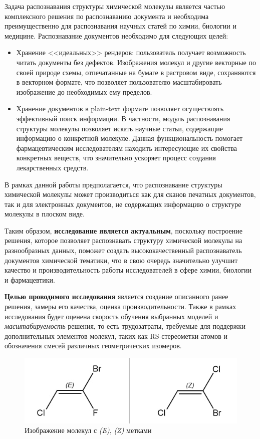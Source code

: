Задача распознавания структуры химической молекулы является частью комплексного решения по распознаванию документа и необходима преимущественно для распознавания научных статей по химии, биологии и медицине. Распознавание документов необходимо для следующих целей:
\begin{itemize}
	\item Хранение <<идеальных>> рендеров: пользователь получает возможность читать документы без дефектов. Изображения молекул и другие векторные по своей природе схемы, отпечатанные на бумаге в растровом виде, сохраняются в векторном формате, что позволяет пользователю масштабировать изображение до необходимых ему пределов.
	
	\item Хранение документов в plain-text формате позволяет осуществлять эффективный поиск информации. В частности, модуль распознавания структуры молекулы позволяет искать научные статьи, содержащие информацию о конкретной молекуле. Данная функциональность помогает фармацевтическим исследователям находить интересующие их свойства конкретных веществ, что значительно ускоряет процесс создания лекарственных средств.
\end{itemize}

В рамках данной работы предполагается, что распознавание структуры химической молекулы может производиться как для сканов печатных документов, так и для электронных документов, не содержащих информацию о структуре молекулы в плоском виде.

Таким образом, \textbf{исследование является актуальным}, поскольку построение решения, которое позволяет распознавать структуру химической молекулы на разнообразных данных, поможет создать высококачественный распознаватель документов химической тематики, что в свою очередь значительно улучшит качество и производительность работы исследователей в сфере химии, биологии и фармацевтики.

\textbf{Целью проводимого исследования} является создание описанного ранее решения, замеры его качества, оценка производительности. Также в рамках исследования будет оценена скорость обучения выбранных моделей и \textit{масштабируемость} решения, то есть трудозатраты, требуемые для поддержки дополнительных элементов молекул, таких как RS-стереометки атомов и обозначения смесей различных геометрических изомеров.

\begin{figure}[h!] 
	\center
	\includegraphics [scale=0.74] {my_folder/images/ez}
	\caption{Изображение молекул с \textit{(E)}, \textit{(Z)} метками \cite{stereochem}}
	\label{fig:ez}  
\end{figure}

